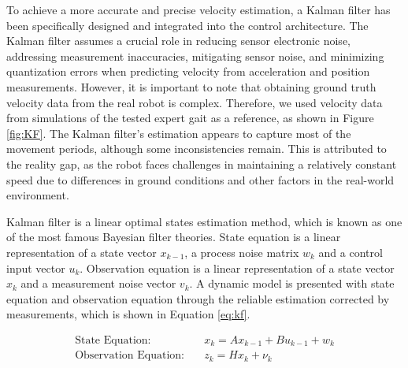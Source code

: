 To achieve a more accurate and precise velocity estimation, a Kalman filter has been specifically designed and integrated into the control architecture. The Kalman filter assumes a crucial role in reducing sensor electronic noise, addressing measurement inaccuracies, mitigating sensor noise, and minimizing quantization errors when predicting velocity from acceleration and position measurements. However, it is important to note that obtaining ground truth velocity data from the real robot is complex. Therefore, we used velocity data from simulations of the tested expert gait as a reference, as shown in Figure \ref{fig:KF}. The Kalman filter's estimation appears to capture most of the movement periods, although some inconsistencies remain. This is attributed to the reality gap, as the robot faces challenges in maintaining a relatively constant speed due to differences in ground conditions and other factors in the real-world environment.

Kalman filter is a linear optimal states estimation method, which is known as one of the most famous Bayesian filter theories. State equation is a linear representation of a state vector $x_{k-1}$, a process noise matrix $w_{k}$ and a control input vector $u_{k}$. Observation equation is a linear representation of a state vector $x_{k}$ and a measurement noise vector $v_{k}$. A dynamic model is presented with state equation and observation equation through the reliable estimation corrected by measurements, which is shown in Equation \ref{eq:kf}.

\begin{equation}
    \begin{aligned}
        \text{State Equation:} \quad & x_{k} = A x_{k-1} + B u_{k-1} + w_{k} \\
        \text{Observation Equation:} \quad & z_{k} = H x_{k} + \nu_{k}
    \end{aligned}
\label{eq:kf}
\end{equation}

